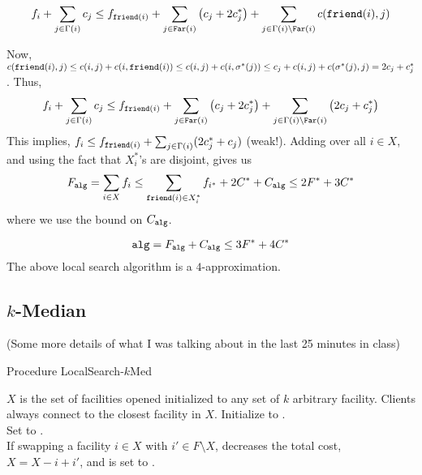 \documentclass[11pt]{article}
\def\alg{{\tt alg}}
\newlength{\algobox}
\begin{document}
\begin{align}
f_i + \sum_{j\in \Gamma(i)}c_j \le f_{{\tt friend}(i)} + \sum_{j\in {\tt Far}(i)}\left(c_j + 2c^*_j\right) + \sum_{j\in \Gamma(i)\setminus{\tt Far}(i)} c({\tt friend}(i),j)
\end{align}

Now, $c({\tt friend}(i),j) \le c(i,j) + c(i,{\tt friend}(i)) \le c(i,j) + c(i,\sigma^*(j)) \le c_j + c(i,j) + c(\sigma^*(j),j) = 2c_j + c^*_j$.
Thus, 
$$ f_i +  \sum_{j\in \Gamma(i)}c_j \le f_{{\tt friend}(i)} + \sum_{j\in {\tt Far}(i)}\left(c_j + 2c^*_j\right) + \sum_{j\in \Gamma(i)\setminus{\tt Far}(i)} \left(2c_j + c^*_j \right)$$
This implies, $f_i \le f_{{\tt friend}(i)} + \sum_{j\in \Gamma(i)} (2c^*_j + c_j)$ (weak!). Adding over all $i\in X$, and using the fact that $X^*_i$'s are disjoint, gives us
$$F_{\alg} = \sum_{i\in X}f_i \le \sum_{\friend(i) \in X^*_i} f_{i^*} + 2C^* + C_{\alg} \le 2F^* + 3C^* $$
where we use the bound on $C_{\alg}$.  

$$\alg = F_{\alg} + C_{\alg} \le 3F^* + 4C^*$$
\noindent
The above local search algorithm is a $4$-approximation.  

%


\subsection*{$k$-Median}
(Some more details of what I was talking about in the last 25 minutes in class)

\vspace{2ex}\noindent
\begin{boxedminipage}{\algobox}
Procedure {\sc LocalSearch-$k$Med}
\begin{algorithmic}[1]
  \STATE $X$ is the set of facilities opened initialized to any set of $k$ arbitrary facility. 
   	      Clients always connect to the closest facility in $X$. Initialize \loc to  \false.\\
  	\STATE Set \loc to \true. \\
          If swapping a facility $i \in X$ with $i'\in F\setminus X$, decreases the total cost,  					  $X=X - i + i'$, and \loc is set to \false.
\ENDWHILE
\end{algorithmic}
\end{boxedminipage}
\vspace{1ex}
\end{document}
